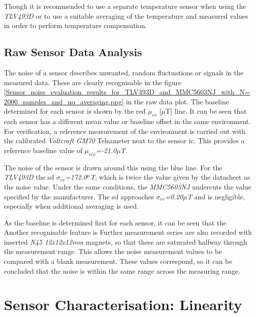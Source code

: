 Though it is recommended to use a separate temperature sensor when using
the \emph{TLV493D} or to use a suitable averaging of the temperature and
measured values in order to perform temperature compensation.

\hypertarget{raw-sensor-data-analysis}{%
\subsection{Raw Sensor Data Analysis}\label{raw-sensor-data-analysis}}

The noise of a sensor describes unwanted, random fluctuations or signals
in the measured data. These are clearly recognisable in the figure
\ref{Sensor_noise_evaluation_results_for_TLV493D_and_MMC5603NJ_with_N=2000_samples_and_no_averaging.png}
in the raw data plot. The baseline determined for each sensor is shown
by the red \(\mu_{rv}\) {[}\(\mu\)T{]} line. It can be seen that each
sensor has a different mean value or baseline offset in the same
environment. For verification, a reference measurement of the
environment is carried out with the calibrated \emph{Voltcraft GM70}
Telsameter next to the sensor \gls{ic}. This provides a reference
baseline value of \emph{\(\mu_{rev}\)=-21.0\(\mu\)T}.

The noise of the sensor is drawn around this using the blue line. For
the \emph{TLV493D} the \gls{sd} \emph{\(\sigma_{rv}\)=172.0\(^{\mu}\)T},
which is twice the value given by the datasheet as the noise value.
Under the same conditions, the \emph{MMC5603NJ} undercuts the value
specified by the manufacturer. The \gls{sd} approaches
\emph{\(\sigma_{rv}\)=0.20\({\mu}\)T} and is negligible, especially when
additional averaging is used.

As the baseline is determined first for each sensor, it can be seen that
the Another recognisable feature is Further measurement series are also
recorded with inserted \emph{N45 12x12x12mm} magnets, so that these are
saturated halfway through the measurement range. This allows the noise
measurement values to be compared with a blank measurement. These values
correspond, so it can be concluded that the noise is within the same
range across the measuring range.

\hypertarget{sensor-characterisation-linearity}{%
\section{Sensor Characterisation:
Linearity}\label{sensor-characterisation-linearity}}

